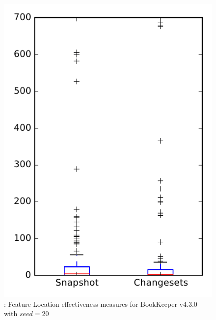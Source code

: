 
\begin{figure}
\centering
\includegraphics[height=0.4\textheight]{figures/flt_seed/rq1_bookkeeper_20}
\caption{\rone: Feature Location effectiveness measures for BookKeeper v4.3.0 with $seed=20$}
\label{fig:flt_seed:rq1:bookkeeper}
\end{figure}
